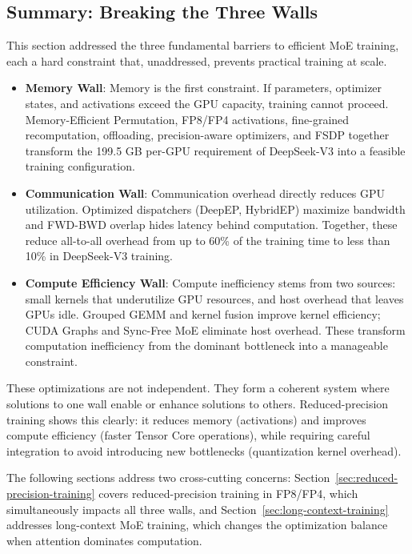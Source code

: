 \subsection{Summary: Breaking the Three Walls}

This section addressed the three fundamental barriers to efficient MoE training, each a hard constraint that, unaddressed, prevents practical training at scale.

\begin{itemize}
    \item \textbf{Memory Wall}: Memory is the first constraint. If parameters, optimizer states, and activations exceed the GPU capacity, training cannot proceed. Memory-Efficient Permutation, FP8/FP4 activations, fine-grained recomputation, offloading, precision-aware optimizers, and FSDP together transform the 199.5 GB per-GPU requirement of DeepSeek-V3 into a feasible training configuration.

    \item \textbf{Communication Wall}: Communication overhead directly reduces GPU utilization. Optimized dispatchers (DeepEP, HybridEP) maximize bandwidth and FWD-BWD overlap hides latency behind computation. Together, these reduce all-to-all overhead from up to 60\% of the training time to less than 10\% in DeepSeek-V3 training.

    \item \textbf{Compute Efficiency Wall}: Compute inefficiency stems from two sources: small kernels that underutilize GPU resources, and host overhead that leaves GPUs idle. Grouped GEMM and kernel fusion improve kernel efficiency; CUDA Graphs and Sync-Free MoE eliminate host overhead. These transform computation inefficiency from the dominant bottleneck into a manageable constraint.
\end{itemize}

These optimizations are not independent. They form a coherent system where solutions to one wall enable or enhance solutions to others. Reduced-precision training shows this clearly: it reduces memory (activations) and improves compute efficiency (faster Tensor Core operations), while requiring careful integration to avoid introducing new bottlenecks (quantization kernel overhead).

The following sections address two cross-cutting concerns: Section~\ref{sec:reduced-precision-training} covers reduced-precision training in FP8/FP4, which simultaneously impacts all three walls, and Section~\ref{sec:long-context-training} addresses long-context MoE training, which changes the optimization balance when attention dominates computation.


